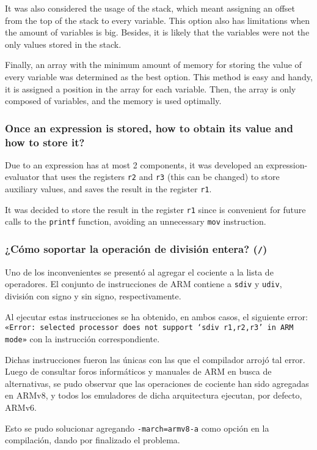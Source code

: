 \documentclass[12pt,spanish]{article}
\begin{document}
It was also considered the usage of the stack, which meant assigning an offset from the top of the stack to every variable. This option also has limitations when the amount of variables is big. Besides, it is likely that the variables were not the only values stored in the stack.

Finally, an array with the minimum amount of memory for storing the value of every variable was determined as the best option. This method is easy and handy, it is assigned a position in the array for each variable. Then, the array is only composed of variables, and the memory is used optimally.

\subsubsection{Once an expression is stored, how to obtain its value and how to store it?}

Due to an expression has at most 2 components, it was developed an expression-evaluator that uses the registers \texttt{r2} and \texttt{r3} (this can be changed) to store auxiliary values, and saves the result in the register \texttt{r1}.

It was decided to store the result in the register \texttt{r1} since is convenient for future calls to the \texttt{printf} function, avoiding an unnecessary \texttt{mov} instruction.

\subsubsection{¿Cómo soportar la operación de división entera? (\texttt{/})}

Uno de los inconvenientes se presentó al agregar el cociente a la lista de operadores. El conjunto de instrucciones de ARM contiene a \texttt{sdiv} y \texttt{udiv}, división con signo y sin signo, respectivamente. 

Al ejecutar estas instrucciones se ha obtenido, en ambos casos, el siguiente error: \texttt{«Error: selected processor does not support `sdiv r1,r2,r3' in ARM mode»} con la instrucción correspondiente.

Dichas instrucciones fueron las únicas con las que el compilador arrojó tal error. Luego de consultar foros informáticos y manuales de ARM en busca de alternativas, se pudo observar que las operaciones de cociente han sido agregadas en ARMv8, y todos los emuladores de dicha arquitectura ejecutan, por defecto, ARMv6. 

Esto se pudo solucionar agregando \texttt{-march=armv8-a} como opción en la compilación, dando por finalizado el problema.
\end{document}
